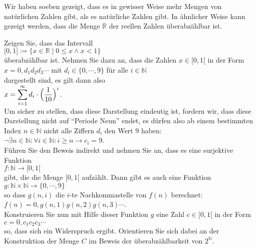 \remark
Wir haben soeben gezeigt, dass es in gewisser Weise mehr Mengen von nat\"{u}rlichen Zahlen gibt, als es
nat\"{u}rliche Zahlen gibt.  In \"{a}hnlicher Weise kann gezeigt werden, dass die Menge $\mathbb{R}$ der reellen
Zahlen \"{u}berabz\"{a}hlbar ist.  
\pagebreak

\exercise
Zeigen Sie, dass das Intervall
\\[0.2cm]
\hspace*{1.3cm}
$[0,1[ := \{ x \in \mathbb{R} \mid 0 \leq x \wedge x < 1 \}$ 
\\[0.2cm]
\"{u}berabz\"{a}hlbar ist.  Nehmen Sie dazu an, dass die Zahlen $x \in [0,1[$ in der Form
\\[0.2cm]
\hspace*{1.3cm}
$ x = 0, d_1 d_2 d_3 \cdots$ \quad mit $d_i \in \{ 0, \cdots, 9 \}$  f\"{u}r alle $i \in \mathbb{N}$
\\[0.2cm]
dargestellt sind, es gilt dann also
\\[0.2cm]
\hspace*{1.3cm}
$\displaystyle x = \sum\limits_{i=1}^\infty d_i \cdot \Bigl(\frac{1}{10}\Bigr)^{i}$.
\\[0.2cm]
Um sicher zu stellen, dass diese Darstellung eindeutig ist, fordern wir, dass diese Darstellung
nicht auf ``Periode Neun'' endet, es d\"{u}rfen also ab einem bestimmten Index $n \in \mathbb{N}$ nicht
alle Ziffern $d_i$ den Wert $9$ haben:
\\[0.2cm]
\hspace*{1.3cm}
$\neg \exists n \in \mathbb{N}: \forall i \in \mathbb{N}: i \geq n \rightarrow c_i = 9$.
\\[0.2cm]
F\"{u}hren Sie den Beweis indirekt und nehmen Sie an, dass es eine surjektive Funktion 
\\[0.2cm]
\hspace*{1.3cm}
$f: \mathbb{N} \rightarrow [0,1[$
\\[0.2cm]
gibt, die die Menge $[0,1[$ aufz\"{a}hlt.  Dann gibt es auch eine Funktion
\\[0.2cm]
\hspace*{1.3cm}
$g: \mathbb{N} \times \mathbb{N} \rightarrow \{0, \cdots, 9\}$
\\[0.2cm]
so dass $g(n,i)$ die $i$-te Nachkommastelle von $f(n)$ berechnet:
\\[0.2cm]
\hspace*{1.3cm}
$f(n) = 0,g(n,1) g(n,2) g(n,3) \cdots$.
\\[0.2cm]
Konstruieren Sie nun mit Hilfe dieser Funktion $g$ eine Zahl $c \in [0,1[$ in der Form
\\[0.2cm]
\hspace*{1.3cm}
$c = 0,c_1c_2c_3 \cdots$
\\[0.2cm]
so, dass sich ein Widerspruch ergibt.  Orientieren Sie sich dabei an der Konstruktion der Menge $C$ im
Beweis der \"{u}berabz\"{a}hlbarkeit von $2^\mathbb{N}$.  \exend

